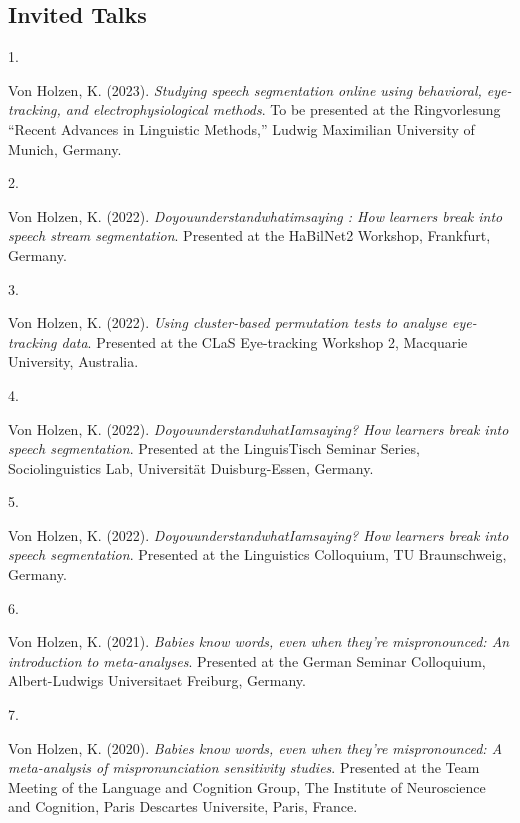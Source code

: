 \documentclass[10pt,a4paper,]{article}
\newlength{\cslhangindent}
\newlength{\csllabelwidth}
\newcommand{\CSLLeftMargin}[1]{\parbox[t]{\csllabelwidth}{\hfill #1~}}
\newcommand{\CSLRightInline}[1]{\parbox[t]{\linewidth - \cslhangindent - \csllabelwidth}{#1}\vspace{0.8ex}}
\begin{document}
\hypertarget{invited-talks}{%
\subsection{Invited Talks}\label{invited-talks}}

\hypertarget{bibliography}{}
\leavevmode{}%
\CSLLeftMargin{1. }%
\CSLRightInline{Von Holzen, K. (2023). \emph{Studying speech
segmentation online using behavioral, eye-tracking, and
electrophysiological methods}. To be presented at the Ringvorlesung
{``Recent Advances in Linguistic Methods,''} Ludwig Maximilian
University of Munich, Germany.}

\leavevmode{}%
\CSLLeftMargin{2. }%
\CSLRightInline{Von Holzen, K. (2022). \emph{Doyouunderstandwhatimsaying
: How learners break into speech stream segmentation}. Presented at the
HaBilNet2 Workshop, Frankfurt, Germany.}

\leavevmode{}%
\CSLLeftMargin{3. }%
\CSLRightInline{Von Holzen, K. (2022). \emph{Using cluster-based
permutation tests to analyse eye-tracking data}. Presented at the CLaS
Eye-tracking Workshop 2, Macquarie University, Australia.}

\leavevmode{}%
\CSLLeftMargin{4. }%
\CSLRightInline{Von Holzen, K. (2022).
\emph{DoyouunderstandwhatIamsaying? How learners break into speech
segmentation}. Presented at the LinguisTisch Seminar Series,
Sociolinguistics Lab, Universität Duisburg-Essen, Germany.}

\leavevmode{}%
\CSLLeftMargin{5. }%
\CSLRightInline{Von Holzen, K. (2022).
\emph{DoyouunderstandwhatIamsaying? How learners break into speech
segmentation}. Presented at the Linguistics Colloquium, TU Braunschweig,
Germany.}

\leavevmode{}%
\CSLLeftMargin{6. }%
\CSLRightInline{Von Holzen, K. (2021). \emph{Babies know words, even
when they're mispronounced: An introduction to meta-analyses}. Presented
at the German Seminar Colloquium, Albert-Ludwigs Universitaet Freiburg,
Germany.}

\leavevmode{}%
\CSLLeftMargin{7. }%
\CSLRightInline{Von Holzen, K. (2020). \emph{Babies know words, even
when they're mispronounced: A meta-analysis of mispronunciation
sensitivity studies}. Presented at the Team Meeting of the Language and
Cognition Group, The Institute of Neuroscience and Cognition, Paris
Descartes Universite, Paris, France.}
\end{document}
